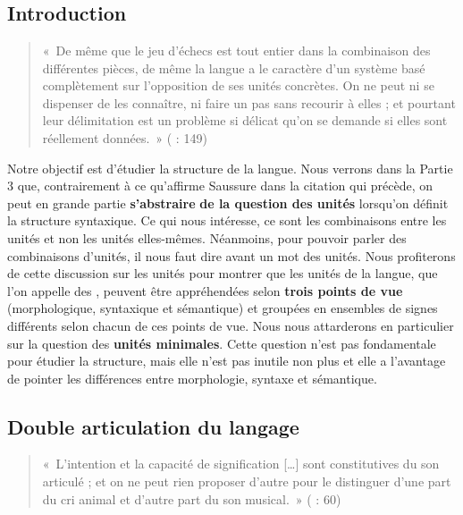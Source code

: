 \chapter{}\label{sec:2.1}

\section{Introduction}\label{sec:2.1.0}

\begin{quote}
    «~De même que le jeu d’échecs est tout entier dans la combinaison des différentes pièces, de même la langue a le caractère d’un système basé complètement sur l’opposition de ses unités concrètes. On ne peut ni se dispenser de les connaître, ni faire un pas sans recourir à elles ; et pourtant leur délimitation est un problème si délicat qu’on se demande si elles sont réellement données.~» (\citealt{saussure1916cours} : 149)
\end{quote}

Notre objectif est d’étudier la structure de la langue. Nous verrons dans la Partie 3 que, contrairement à ce qu’affirme Saussure dans la citation qui précède, on peut en grande partie \textbf{s’abstraire} \textbf{de la question des unités} lorsqu’on définit la structure syntaxique. Ce qui nous intéresse, ce sont les combinaisons entre les unités et non les unités elles-mêmes. Néanmoins, pour pouvoir parler des combinaisons d’unités, il nous faut dire avant un mot des unités. Nous profiterons de cette discussion sur les unités pour montrer que les unités de la langue, que l’on appelle des , peuvent être appréhendées selon \textbf{trois points de vue} (morphologique, syntaxique et sémantique) et groupées en ensembles de signes différents selon chacun de ces points de vue. Nous nous attarderons en particulier sur la question des \textbf{unités minimales}. Cette question n’est pas fondamentale pour étudier la structure, mais elle n’est pas inutile non plus et elle a l’avantage de pointer les différences entre morphologie, syntaxe et sémantique.

\section{Double articulation du langage}\label{sec:2.1.1}

\begin{quote}
    «~L’intention et la capacité de signification […] sont constitutives du son articulé ; et on ne peut rien proposer d’autre pour le distinguer d’une part du cri animal et d’autre part du son musical.~» (\citealt{Humboldt1836} : 60)
\end{quote}

